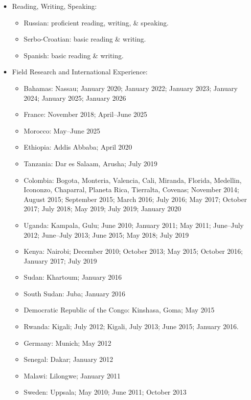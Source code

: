 \documentclass[10pt]{article}
\begin{document}
\begin{itemize}\setlength{\itemsep}{1pt}
\item Reading, Writing, Speaking:
    \begin{itemize} \setlength{\itemsep}{1pt}
    \item Russian: proficient reading, writing, \& speaking.
    \item Serbo-Croatian: basic reading \& writing.
    \item Spanish: basic reading \& writing.
    \end{itemize}
\item Field Research and International Experience: \setlength{\itemsep}{1pt}
    \begin{itemize}
    \item Bahamas: Nassau; January 2020; January 2022; January 2023; January 2024; January 2025; January 2026
    \item France: November 2018; April--June 2025
    \item Morocco: May--June 2025
    \item Ethiopia: Addis Abbaba; April 2020
    \item Tanzania: Dar es Salaam, Arusha; July 2019
    \item Colombia: Bogota, Monteria, Valencia, Cali, Miranda, Florida, Medellin, Icononzo, Chaparral, Planeta Rica, Tierralta, Covenas; November 2014; August 2015; September 2015; March 2016; July 2016; May 2017; October 2017; July 2018; May 2019; July 2019; January 2020
    \item Uganda: Kampala, Gulu; June 2010; January 2011; May 2011; June--July 2012; June--July 2013; June 2015; May 2018; July 2019
    \item Kenya: Nairobi; December 2010; October 2013; May 2015; October 2016; January 2017; July 2019
    \item Sudan: Khartoum; January 2016
    \item South Sudan: Juba; January 2016
    \item Democratic Republic of the Congo: Kinshasa, Goma; May 2015
    \item Rwanda: Kigali; July 2012; Kigali, July 2013; June 2015; January 2016.
    \item Germany: Munich; May 2012
    \item Senegal: Dakar; January 2012
    \item Malawi: Lilongwe; January 2011
    \item Sweden: Uppsala; May 2010; June 2011; October 2013

\end{itemize}
\end{itemize}
\end{document}
